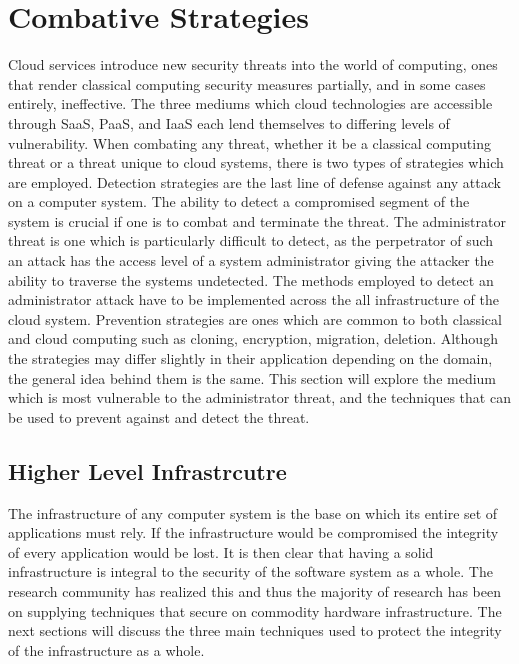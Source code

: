 \section{Combative Strategies}
\label{overview}

Cloud services introduce new security threats into the world of computing, ones that render classical computing security measures partially, and in some cases entirely, ineffective. The three mediums which cloud technologies are accessible through SaaS, PaaS, and IaaS each lend themselves to differing levels of vulnerability. When combating any threat, whether it be a classical computing threat or a threat unique to cloud systems, there is two types of strategies which are employed.
Detection strategies are the last line of defense against any attack on a computer system. The ability to detect a compromised segment of the system is crucial if one is to combat and terminate the threat. The administrator threat is one which is particularly difficult to detect, as the perpetrator of such an attack has the access level of a system administrator giving the attacker the ability to traverse the systems undetected. The methods employed to detect an administrator attack have to be implemented across the all infrastructure of the cloud system.
Prevention strategies are ones which are common to both classical and cloud computing such as cloning, encryption, migration, deletion. Although the strategies may differ slightly in their application depending on the domain, the general idea behind them is the same.
This section will explore the medium which is most vulnerable to the administrator threat, and the techniques that can be used to prevent against and detect the threat.


\subsection{Higher Level Infrastrcutre}
\label{hlInfrastructure}

The infrastructure of any computer system is the base on which its entire set of applications must rely. If the infrastructure would be compromised the integrity of every application would be lost. It is then clear that having a solid infrastructure is integral to the security of the software system as a whole. The research community has realized this and thus the majority of research has been on supplying techniques that secure on commodity hardware infrastructure. The next sections will discuss the three main techniques used to protect the integrity of the infrastructure as a whole.


